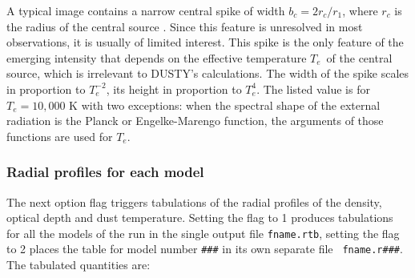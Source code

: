 \documentclass[11pt]{article}
\def\D    {{\sf DUSTY}}
\def\Te   {\hbox{$T_e$}}
\begin{document}
A typical image contains a narrow central spike of width $b_c =
2r_c/r_1$, where $r_c$ is the radius of the central source
\cite{IE96a}.  Since this feature is unresolved in most observations,
it is usually of limited interest.  This spike is the only feature of
the emerging intensity that depends on the effective temperature \Te\
of the central source, which is irrelevant to \D's calculations. The
width of the spike scales in proportion to $T_e^{-2}$, its height in
proportion to $T_e^4$. The listed value is for $T_e = 10,000$ K with
two exceptions: when the spectral shape of the external radiation is
the Planck or Engelke-Marengo function, the arguments of those
functions are used for $T_e$.

\subsubsection{Radial profiles for each model}
\label{sec:radial_sph}

The next option flag triggers tabulations of the radial profiles of
the density, optical depth and dust temperature. Setting the flag to 1
produces tabulations for all the models of the run in the single
output file {\tt fname.rtb}, setting the flag to 2 places the table
for model number {\tt \#\#\#} in its own separate file {\tt
  fname.r\#\#\#}. The tabulated quantities are:
\end{document}
